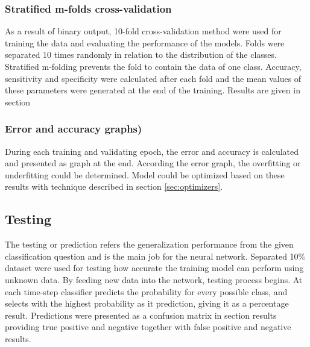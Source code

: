 \subsubsection{Stratified m-folds cross-validation}
As a result of binary output, 10-fold cross-validation method were used for training the data and evaluating the performance of the models. Folds were separated 10 times randomly in relation to the distribution of the classes. Stratified m-folding prevents the fold to contain the data of one class. Accuracy, sensitivity and specificity were calculated after each fold and the mean values of these parameters were generated at the end of the training. Results are given in section %

\subsubsection{Error and accuracy graphs)}
During each training and validating epoch, the error and accuracy is calculated and presented as graph at the end. According the error graph, the overfitting or underfitting could be determined. Model could be optimized based on these results with technique described in section \ref{sec:optimizers}.

\subsection{Testing}
The testing or prediction refers the generalization performance from the given classification question and is the main job for the neural network.
Separated 10\% dataset were used for testing how accurate the training model can perform using unknown data. By feeding new data into the network, testing process begins. At each time-step classifier predicts the probability for every possible class, and selects with the highest probability as it prediction, giving it as a percentage result. Predictions were presented as a confusion matrix in section {results} providing true positive and negative together with false positive and negative results.
